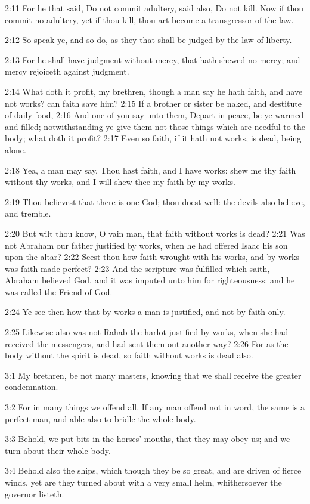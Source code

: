 2:11 For he that said, Do not commit adultery, said also, Do not kill.
Now if thou commit no adultery, yet if thou kill, thou art become a
transgressor of the law.

2:12 So speak ye, and so do, as they that shall be judged by the law
of liberty.

2:13 For he shall have judgment without mercy, that hath shewed no
mercy; and mercy rejoiceth against judgment.

2:14 What doth it profit, my brethren, though a man say he hath faith,
and have not works? can faith save him?  2:15 If a brother or sister
be naked, and destitute of daily food, 2:16 And one of you say unto
them, Depart in peace, be ye warmed and filled; notwithstanding ye
give them not those things which are needful to the body; what doth it
profit?  2:17 Even so faith, if it hath not works, is dead, being
alone.

2:18 Yea, a man may say, Thou hast faith, and I have works: shew me
thy faith without thy works, and I will shew thee my faith by my
works.

2:19 Thou believest that there is one God; thou doest well: the devils
also believe, and tremble.

2:20 But wilt thou know, O vain man, that faith without works is dead?
2:21 Was not Abraham our father justified by works, when he had
offered Isaac his son upon the altar?  2:22 Seest thou how faith
wrought with his works, and by works was faith made perfect?  2:23 And
the scripture was fulfilled which saith, Abraham believed God, and it
was imputed unto him for righteousness: and he was called the Friend
of God.

2:24 Ye see then how that by works a man is justified, and not by
faith only.

2:25 Likewise also was not Rahab the harlot justified by works, when
she had received the messengers, and had sent them out another way?
2:26 For as the body without the spirit is dead, so faith without
works is dead also.

3:1 My brethren, be not many masters, knowing that we shall receive
the greater condemnation.

3:2 For in many things we offend all. If any man offend not in word,
the same is a perfect man, and able also to bridle the whole body.

3:3 Behold, we put bits in the horses' mouths, that they may obey us;
and we turn about their whole body.

3:4 Behold also the ships, which though they be so great, and are
driven of fierce winds, yet are they turned about with a very small
helm, whithersoever the governor listeth.

